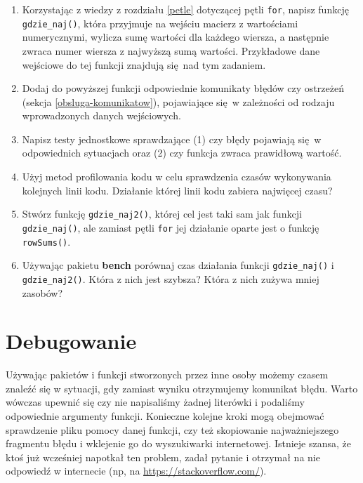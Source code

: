 \documentclass[paper=6in:9in,pagesize=pdftex,headinclude=on,footinclude=on,10pt]{scrbook}
\begin{document}
\begin{enumerate}
\def\labelenumi{\arabic{enumi})}
\item
  Korzystając z wiedzy z rozdziału \ref{petle} dotyczącej pętli \texttt{for}, napisz funkcję \texttt{gdzie\_naj()}, która przyjmuje na wejściu macierz z wartościami numerycznymi, wylicza sumę wartości dla każdego wiersza, a następnie zwraca numer wiersza z najwyższą sumą wartości.
  Przykładowe dane wejściowe do tej funkcji znajdują się~nad tym zadaniem.
\item
  Dodaj do powyższej funkcji odpowiednie komunikaty błędów czy ostrzeżeń (sekcja \ref{obsluga-komunikatow}), pojawiające się~w zależności od rodzaju wprowadzonych danych wejściowych.
\item
  Napisz testy jednostkowe sprawdzające (1) czy błędy pojawiają się~w odpowiednich sytuacjach oraz (2) czy funkcja zwraca prawidłową wartość.
\item
  Użyj metod profilowania kodu w celu sprawdzenia czasów wykonywania kolejnych linii kodu.
  Działanie której linii kodu zabiera najwięcej czasu?
\item
  Stwórz funkcję \texttt{gdzie\_naj2()}, której cel jest taki sam jak funkcji \texttt{gdzie\_naj()}, ale zamiast pętli \texttt{for} jej działanie oparte jest o funkcję \texttt{rowSums()}.
\item
  Używając pakietu \textbf{bench} porównaj czas działania funkcji \texttt{gdzie\_naj()} i \texttt{gdzie\_naj2()}.
  Która z nich jest szybsza?
  Która z nich zużywa mniej zasobów?
\end{enumerate}

\hypertarget{debugging}{%
\chapter{Debugowanie}\label{debugging}}

Używając pakietów i funkcji stworzonych przez inne osoby możemy czasem znaleźć się w sytuacji, gdy zamiast wyniku otrzymujemy komunikat błędu.
Warto wówczas upewnić się czy nie napisaliśmy żadnej literówki i podaliśmy odpowiednie argumenty funkcji.
Konieczne kolejne kroki mogą obejmować sprawdzenie pliku pomocy danej funkcji, czy też skopiowanie najważniejszego fragmentu błędu i wklejenie go do wyszukiwarki internetowej.
Istnieje szansa, że ktoś już wcześniej napotkał ten problem, zadał pytanie i otrzymał na nie odpowiedź w internecie (np, na \url{https://stackoverflow.com/}).
\end{document}

